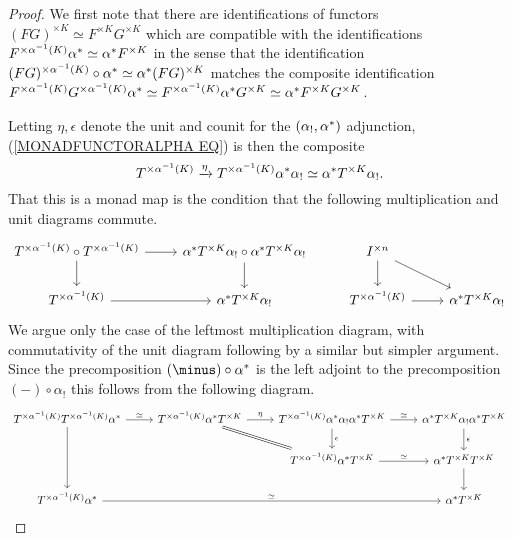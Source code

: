 \documentclass[a4paper,10pt]{article}%
\begin{document}
\begin{proof}
We first note that there are identifications of functors
$(FG)^{\times K} \simeq F^{\times K} G^{\times K}$ which are compatible with the identifications
$F^{\times \alpha^{-1} (K)} \alpha^{\**} \simeq \alpha^{\**} F^{\times K}$
in the sense that the identification
$(F G)^{\times \alpha^{-1} (K)} \circ \alpha^{\**} \simeq 
\alpha^{\**} (FG)^{\times K}$
matches the composite identification
$F^{\times \alpha^{-1} (K)} G^{\times \alpha^{-1} (K)} \alpha^{\**} \simeq
F^{\times \alpha^{-1} (K)}\alpha^{\**}G^{\times K} \simeq
\alpha^{\**} F^{\times K} G^{\times K}$.

Letting $\eta, \epsilon$ denote the unit and counit for the 
$(\alpha_{!},\alpha^{\**})$ adjunction, 
(\ref{MONADFUNCTORALPHA EQ})
is then the composite
\[
	T^{\times \alpha^{-1} (K)} \xrightarrow{\eta} 
	T^{\times \alpha^{-1} (K)} \alpha^{\**} \alpha_{!} \simeq
	\alpha^{\**} T^{\times K}\alpha_{!}.
\]
That this is a monad map is the condition that the following multiplication and unit diagrams commute.
\[
\begin{tikzcd}
	T^{\times \alpha^{-1} (K)} \circ T^{\times \alpha^{-1} (K)} \ar{d} \ar{r} &
	\alpha^{\**} T^{\times K} \alpha_{!} \circ 
	\alpha^{\**} T^{\times K} \alpha_{!} \ar{d} &
	I^{\times n} \ar{d} \ar{rd}& 	
\\
	T^{\times \alpha^{-1} (K)} \ar{r} &
	\alpha^{\**} T^{\times K} \alpha_{!} &
	T^{\times \alpha^{-1} (K)} \ar{r} &
	\alpha^{\**} T^{\times K} \alpha_{!}
\end{tikzcd}
\]
We argue only the case of the leftmost multiplication diagram, with commutativity of the unit diagram following by a similar but simpler argument. Since the precomposition
$(\minus) \circ \alpha^{\**}$
is the left adjoint to the precomposition
$(\minus) \circ \alpha_{!}$
this follows from the following diagram.
\[
\begin{tikzcd}
	T^{\times \alpha^{-1} (K)}  T^{\times \alpha^{-1} (K)}  \alpha^{*} \ar{r}{\simeq} \ar{dd}&
	T^{\times \alpha^{-1} (K)}  \alpha^{*}  T^{\times K} \ar{r}{\eta}
	\ar[equal]{rd} &
	T^{\times \alpha^{-1} (K)} \alpha^{\**} \alpha_{!} \alpha^{*} T^{\times K} \ar{d}{\epsilon} \ar{r}{\simeq}&
	\alpha^{\**} T^{\times K} \alpha_{!} \alpha^{\**}  T^{\times K} \ar{d}{\epsilon}
\\
	& &
	T^{\times \alpha^{-1} (K)}  \alpha^{*}  T^{\times K} \ar{r}{\simeq} &
	\alpha^{*}  T^{\times K}  T^{\times K} \ar{d}
\\
	T^{\times \alpha^{-1} (K)}  \alpha^{*} \ar{rrr}{\simeq} &&&
	\alpha^{*} T^{\times K}
\end{tikzcd}
\]
\end{proof}
\end{document}
